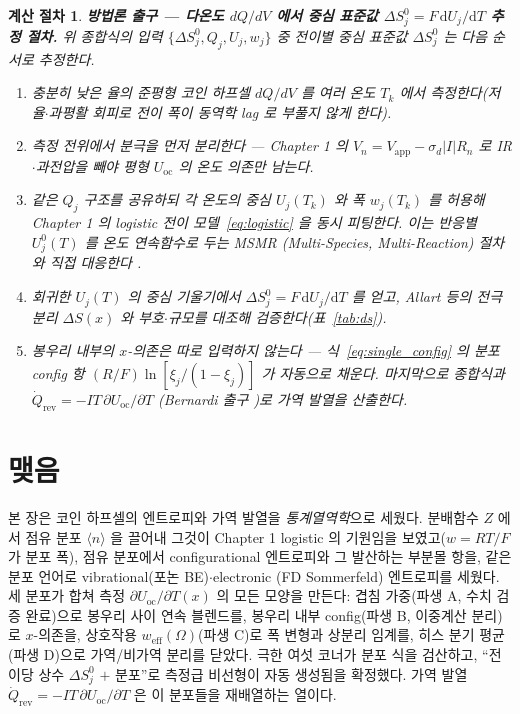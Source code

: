 \documentclass[11pt,a4paper]{article}
\newtheorem*{procedurebox}{계산 절차}
\newcommand{\dd}{\mathrm{d}}
\newcommand{\rev}{\mathrm{rev}}
\newcommand{\oc}{\mathrm{oc}}
\newcommand{\eff}{\mathrm{eff}}
\newcommand{\avg}[1]{\langle #1\rangle}
\begin{document}
\begin{procedurebox}
\textbf{방법론 출구 — 다온도 $dQ/dV$ 에서 중심 표준값 $\Delta S^0_j=F\,\dd U_j/\dd T$ 추정 절차.} 위 종합식의 입력
$\{\Delta S^0_j,Q_j,U_j,w_j\}$ 중 전이별 중심 표준값 $\Delta S^0_j$ 는 다음 순서로 추정한다.
\begin{enumerate}[leftmargin=1.8em,itemsep=2pt,topsep=2pt]
\item 충분히 낮은 율의 준평형 코인 하프셀 $dQ/dV$ 를 여러 온도 $T_k$ 에서 측정한다(저율$\cdot$과평활 회피로
전이 폭이 동역학 lag 로 부풀지 않게 한다).
\item 측정 전위에서 분극을 먼저 분리한다 — Chapter 1 의 $V_n=V_\mathrm{app}-\sigma_d|I|R_n$ 로 IR$\cdot$과전압을
빼야 \emph{평형} $U_\oc$ 의 온도 의존만 남는다.
\item 같은 $Q_j$ 구조를 공유하되 각 온도의 중심 $U_j(T_k)$ 와 폭 $w_j(T_k)$ 를 허용해 Chapter 1 의 logistic
전이 모델~\eqref{eq:logistic} 을 \emph{동시} 피팅한다. 이는 반응별 $U_j^0(T)$ 를 온도 연속함수로 두는 MSMR
(Multi-Species, Multi-Reaction) 절차와 직접 대응한다 \cite{msmr_partI,msmr_partII}.
\item 회귀한 $U_j(T)$ 의 중심 기울기에서 $\Delta S^0_j=F\,\dd U_j/\dd T$ 를 얻고, Allart 등의 전극 분리
$\Delta S(x)$ \cite{allart2018} 와 부호$\cdot$규모를 대조해 검증한다(표~\ref{tab:ds}).
\item 봉우리 \emph{내부}의 $x$-의존은 따로 입력하지 않는다 — 식~\eqref{eq:single_config} 의 분포 config 항
$(R/F)\ln[\xi_j/(1-\xi_j)]$ 가 자동으로 채운다. 마지막으로 종합식과 $\dot Q_\rev=-IT\,\partial U_\oc/\partial T$
(Bernardi 출구 \cite{bernardi1985})로 가역 발열을 산출한다.
\end{enumerate}
\end{procedurebox}

\section*{맺음}
본 장은 코인 하프셀의 엔트로피와 가역 발열을 \emph{통계열역학}으로 세웠다. 분배함수 $Z$ 에서 점유 분포
$\avg{n}$ 을 끌어내 그것이 Chapter 1 logistic 의 기원임을 보였고($w=RT/F$ 가 분포 폭), 점유 분포에서
configurational 엔트로피와 그 발산하는 부분몰 항을, 같은 분포 언어로 vibrational(포논 BE)$\cdot$electronic
(FD Sommerfeld) 엔트로피를 세웠다. 세 분포가 합쳐 측정 $\partial U_\oc/\partial T(x)$ 의 모든 모양을 만든다:
겹침 가중(파생 A, 수치 검증 완료)으로 봉우리 사이 연속 블렌드를, 봉우리 내부 config(파생 B, 이중계산 분리)로
$x$-의존을, 상호작용 $w_\eff(\Omega)$(파생 C)로 폭 변형과 상분리 임계를, 히스 분기 평균(파생 D)으로 가역/비가역
분리를 닫았다. 극한 여섯 코너가 분포 식을 검산하고, ``전이당 상수 $\Delta S^0_j$ $+$ 분포''로 측정급 비선형이
자동 생성됨을 확정했다. 가역 발열 $\dot Q_\rev=-IT\,\partial U_\oc/\partial T$ 은 이 분포들을 재배열하는 열이다.
\end{document}
